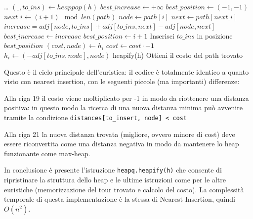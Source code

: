 \documentclass[a4paper,12pt]{report}
\begin{document}
\begin{tcolorbox}[colframe=black, colback=white, boxrule=0.5pt, title=Farthest Insertion, coltitle=black, fonttitle=\bfseries, colbacktitle=white, breakable]
  \begin{algorithmic}[1]
    \State \dots
      \State $(\_, to\_ins) \gets heappop(h)$
      \State $best\_increase \gets +\infty$
      \State $best\_position \gets (-1, -1)$
      \State $next\_i \gets (i + 1) \mod len(path)$
      \State $node \gets path[i]$
      \State $next \gets path[next\_i]$
      \State $increase = adj[node, to\_ins] + adj[to\_ins, next] - adj[node, next]$
        \State $best\_increase \gets increase$
        \State $best\_position \gets i + 1$
      \EndIf
    \EndFor
    \State Inserisci $to\_ins$ in posizione $best\_position$
      \State $(cost, node) \gets h_i$
      \State $cost \gets cost \cdot -1$
        \State $h_i \gets (-adj[to\_ins, node], node)$
      \EndIf
    \EndFor
    \State heapify(h)
  \EndWhile
  \State Ottieni il costo del path trovato
  \end{algorithmic}
\end{tcolorbox}
Questo è il ciclo principale dell'euristica: il codice è totalmente identico a quanto visto con nearest insertion, con le seguenti piccole (ma importanti) differenze:
\begin{legal}
  \item Alla riga 19 il costo viene moltiplicato per -1 in modo da riottenere una distanza positiva: in questo modo la ricerca di una nuova distanza minima può avvenire tramite la condizione \lstinline!distances[to_insert, node] < cost!
  \item Alla riga 21 la nuova distanza trovata (migliore, ovvero minore di cost) deve essere riconvertita come una distanza negativa in modo da mantenere lo heap funzionante come max-heap.
\end{legal}
In conclusione è presente l'istruzione \lstinline!heapq.heapify(h)! che consente di ripristinare la struttura dello heap e le ultime istruzioni come per le altre euristiche (memorizzazione del tour trovato e calcolo del costo). \newline
La complessità temporale di questa implementazione è la stessa di Nearest Insertion, quindi $O(n^2)$.
\end{document}
